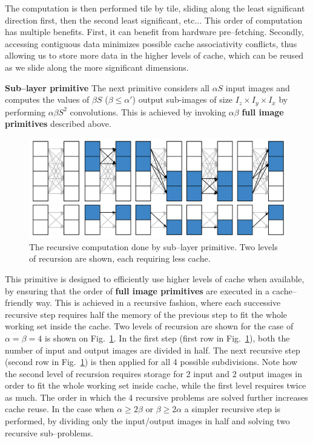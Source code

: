   The computation is then performed tile by tile, sliding along the
  least significant direction first, then the second least
  significant, etc...  This order of computation has multiple
  benefits.  First, it can benefit from hardware pre--fetching.
  Secondly, accessing contiguous data minimizes possible cache
  associativity conflicts, thus allowing us to store more data in the
  higher levels of cache, which can be reused as we slide along the
  more significant dimensions.

  {\bf Sub--layer primitive} \quad The next primitive considers all
  $\alpha S$ input images and computes the values of $\beta S$ ($\beta
  \le \alpha'$) output sub-images of size $I_z \times I_y \times I_x$
  by performing $\alpha \beta S^2$ convolutions.  This is achieved by
  invoking $\alpha \beta$ {\bf full image primitives} described above.

  \begin{figure}
    \begin{center}
      \includegraphics[width=0.8\linewidth]{fig/serialexec}
    \end{center}
    \caption{The recursive computation done by sub--layer primitive.
      Two levels of recursion are shown, each requiring less cache. }
    \label{fig:full-exec}
  \end{figure}

  This primitive is designed to efficiently use higher levels of cache
  when available, by ensuring that the order of {\bf full image
    primitives} are executed in a cache--friendly way.  This is
  achieved in a recursive fashion, where each successive recursive
  step requires half the memory of the previous step to fit the whole
  working set inside the cache.  Two levels of recursion are shown for
  the case of $\alpha = \beta = 4$ is shown on
  Fig.~\ref{fig:full-exec}.  In the first step (first row in
  Fig.~\ref{fig:full-exec}), both the number of input and output
  images are divided in half.  The next recursive step (second row in
  Fig.~\ref{fig:full-exec}) is then applied for all 4 possible
  subdivisions.  Note how the second level of recursion requires
  storage for 2 input and 2 output images in order to fit the whole
  working set inside cache, while the first level requires twice as
  much.  The order in which the 4 recursive problems are solved
  further increases cache reuse.  In the case when $\alpha \ge 2\beta$
  or $\beta \ge 2\alpha$ a simpler recursive step is performed, by
  dividing only the input/output images in half and solving two
  recursive sub--problems.

